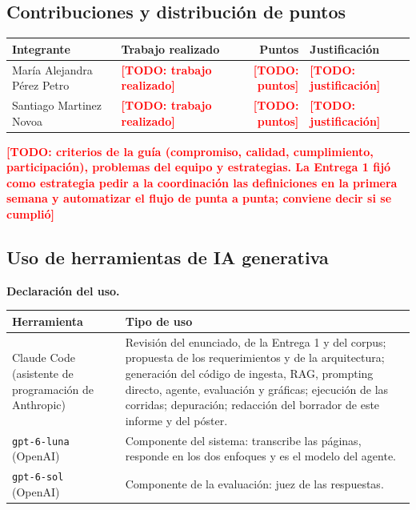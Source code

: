\documentclass[11pt,letterpaper]{article}
\newcommand{\pendiente}[1]{\textcolor{red}{\textbf{[TODO: #1]}}}
\newcommand{\cod}[1]{\texttt{\small #1}}
\begin{document}
\subsection{Contribuciones y distribución de puntos}

\begin{table}[H]\small\renewcommand{\arraystretch}{1.15}
\begin{tabularx}{\textwidth}{>{\raggedright\arraybackslash}p{}LRL}
\toprule
\textbf{Integrante} & \textbf{Trabajo realizado} & \textbf{Puntos} & \textbf{Justificación} \\
\midrule
María Alejandra Pérez Petro & \pendiente{trabajo realizado} & \pendiente{puntos} & \pendiente{justificación} \\
Santiago Martinez Novoa & \pendiente{trabajo realizado} & \pendiente{puntos} & \pendiente{justificación} \\
\bottomrule
\end{tabularx}
\end{table}

\pendiente{criterios de la guía (compromiso, calidad, cumplimiento, participación), problemas del equipo y estrategias. La Entrega 1 fijó como estrategia pedir a la coordinación las definiciones en la primera semana y automatizar el flujo de punta a punta; conviene decir si se cumplió}

\subsection{Uso de herramientas de IA generativa}

\textbf{Declaración del uso.}

\begin{table}[H]\small\renewcommand{\arraystretch}{1.15}
\begin{tabularx}{\textwidth}{>{\raggedright\arraybackslash}p{}L}
\toprule
\textbf{Herramienta} & \textbf{Tipo de uso} \\
\midrule
Claude Code (asistente de programación de Anthropic) & Revisión del enunciado, de la Entrega 1 y del corpus; propuesta de los requerimientos y de la arquitectura; generación del código de ingesta, RAG, prompting directo, agente, evaluación y gráficas; ejecución de las corridas; depuración; redacción del borrador de este informe y del póster. \\
\cod{gpt-6-luna} (OpenAI) & Componente del sistema: transcribe las páginas, responde en los dos enfoques y es el modelo del agente. \\
\cod{gpt-6-sol} (OpenAI) & Componente de la evaluación: juez de las respuestas. \\
\bottomrule
\end{tabularx}
\end{table}
\end{document}
